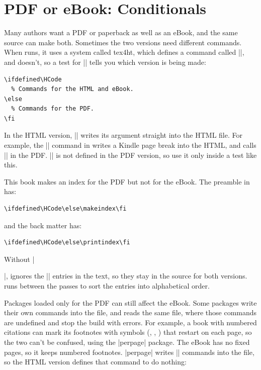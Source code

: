 \section{PDF or eBook: Conditionals}
\label{sec:conditionals}

Many authors want a PDF or paperback as well as an eBook, and the same source can make both.
Sometimes the two versions need different commands.
When  runs, it uses a system called tex4ht, which defines a command called \sverb|\HCode|, and  doesn't, so a test for \sverb|\HCode| tells you which version is being made:

\begin{Verbatim}[fontsize=\small]
\ifdefined\HCode
  % Commands for the HTML and eBook.
\else
  % Commands for the PDF.
\fi
\end{Verbatim}

In the HTML version, \sverb|| writes its argument straight into the HTML file.
For example, the \sverb|\nextpage| command in  writes a Kindle page break into the HTML, and calls \sverb|\newpage| in the PDF.
\sverb|\HCode| is not defined in the PDF version, so use it only inside a test like this.

This book makes an index for the PDF but not for the eBook.
The preamble in  has:

\begin{Verbatim}[fontsize=\small]
\ifdefined\HCode\else\makeindex\fi
\end{Verbatim}

\noindent and the back matter has:

\begin{Verbatim}[fontsize=\small]
\ifdefined\HCode\else\printindex\fi
\end{Verbatim}

Without \sverb|\makeindex|, \latex ignores the \sverb|| entries in the text, so they stay in the source for both versions.
 runs  between the  passes to sort the entries into alphabetical order.

Packages loaded only for the PDF can still affect the eBook.
Some packages write their own commands into the  file, and  reads the same file, where those commands are undefined and stop the build with errors.
For example, a book with numbered citations can mark its footnotes with symbols (\textasteriskcentered, \textdagger, \textdaggerdbl) that restart on each page, so the two can't be confused, using the \sverb|perpage| package.
The eBook has no fixed pages, so it keeps numbered footnotes.
\sverb|perpage| writes \sverb|\pp@pagectr| commands into the  file, so the HTML version defines that command to do nothing:


